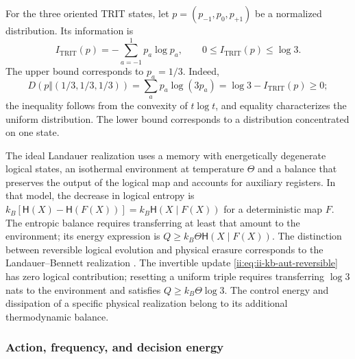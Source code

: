 For the three oriented TRIT states, let
\(p=(p_{-1},p_0,p_{+1})\) be a normalized distribution. Its information is
\begin{equation}
 I_{\mathrm{TRIT}}(p)=-\sum_{a=-1}^{1}p_a\log p_a,
 \qquad 0\leq I_{\mathrm{TRIT}}(p)\leq\log3.
 \label{ii:eq:ii-kb-aut-trit}
\end{equation}
The upper bound corresponds to \(p_a=1/3\). Indeed,
\[
 D(p\Vert(1/3,1/3,1/3))
 =\sum_ap_a\log(3p_a)=\log3-I_{\mathrm{TRIT}}(p)\geq0;
\]
the inequality follows from the convexity of \(t\log t\), and
equality characterizes the uniform distribution. The lower bound
corresponds to a distribution concentrated on one state.

The ideal Landauer realization uses a memory with energetically
degenerate logical states, an isothermal environment at temperature \(\Theta\)
and a balance that preserves the output of the logical map and accounts for
auxiliary registers. In that model, the decrease in logical entropy is
\(k_B[\mathsf H(X)-\mathsf H(F(X))]
=k_B\mathsf H(X\mid F(X))\) for a deterministic map \(F\).
The entropic balance requires transferring at least that amount to the environment;
its energy expression is \(Q\geq k_B\Theta\mathsf H(X\mid F(X))\).
The distinction between reversible logical evolution and physical erasure
corresponds to the Landauer--Bennett realization \cite{ii:bennett2003}.
The invertible update
\eqref{ii:eq:ii-kb-aut-reversible} has zero logical contribution;
resetting a uniform triple requires transferring \(\log3\) nats
to the environment and satisfies \(Q\geq k_B\Theta\log3\).
The control energy and dissipation of a specific physical
realization belong to its additional thermodynamic balance.

\subsubsection{Action, frequency, and decision energy}

